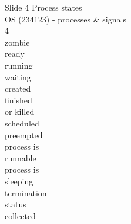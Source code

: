\documentclass{beamer}
\begin{document}
\begin{frame}{Slide 4}
Process states\\OS (234123) - processes \& signals\\4\\zombie\\ready\\running\\waiting\\created\\finished\\or killed\\scheduled\\preempted\\process is\\runnable\\process is\\sleeping\\termination\\status\\collected
\end{frame}
\end{document}

